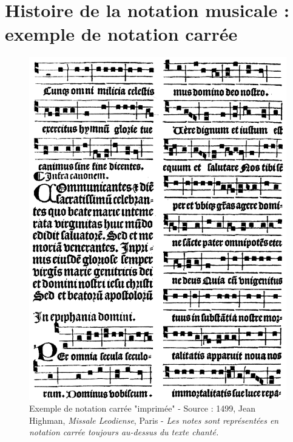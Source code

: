 \section{Histoire de la notation musicale : exemple de notation carrée}
\label{sec:exempleNotationCarree}
\begin{figure}[H]
	\centering
	\includegraphics[keepaspectratio=true, width=\textwidth]{Notation/i/notationCarree.jpg}
	\caption{Exemple de notation carrée "imprimée" - Source : 1499, Jean Highman, \textit{Missale Leodiense}, Paris - \textit{Les notes sont représentées en notation carrée toujours au-dessus du texte chanté.} }
	\label{fig:notationCarree}
\end{figure}
